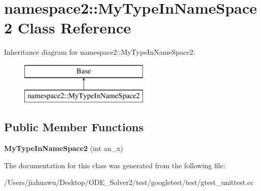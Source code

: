 \hypertarget{classnamespace2_1_1_my_type_in_name_space2}{}\section{namespace2\+:\+:My\+Type\+In\+Name\+Space2 Class Reference}
\label{classnamespace2_1_1_my_type_in_name_space2}
Inheritance diagram for namespace2\+:\+:My\+Type\+In\+Name\+Space2\+:\begin{figure}[H]
\begin{center}
\leavevmode
\includegraphics[height=2.000000cm]{classnamespace2_1_1_my_type_in_name_space2}
\end{center}
\end{figure}
\subsection*{Public Member Functions}
\begin{DoxyCompactItemize}
\item 
\mbox{\label{classnamespace2_1_1_my_type_in_name_space2_a033025628289dbf29022b2bfbe66f53e}} 
{\bfseries My\+Type\+In\+Name\+Space2} (int an\+\_\+x)
\end{DoxyCompactItemize}


The documentation for this class was generated from the following file\+:\begin{DoxyCompactItemize}
\item 
/\+Users/jiahuawu/\+Desktop/\+O\+D\+E\+\_\+\+Solver2/test/googletest/test/gtest\+\_\+unittest.\+cc\end{DoxyCompactItemize}
